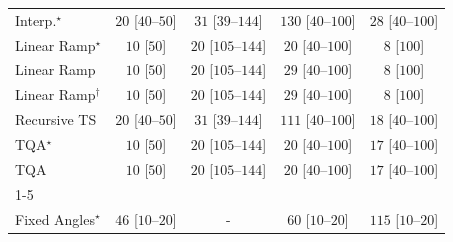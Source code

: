 \begin{tabular}{l|cccc|}
Interp.$^\star$ & {\cellcolor[HTML]{F4FBF2}} \color[HTML]{000000} $20$ [$40$--$50$] & {\cellcolor[HTML]{F2FAEF}} \color[HTML]{000000} $31$ [$39$--$144$] & {\cellcolor[HTML]{DCF2D7}} \color[HTML]{000000} $130$ [$40$--$100$] & {\cellcolor[HTML]{F2FAF0}} \color[HTML]{000000} $28$ [$40$--$100$] \\
Linear Ramp$^\star$ & {\cellcolor[HTML]{F6FCF4}} \color[HTML]{000000} $10$ [$50$] & {\cellcolor[HTML]{F4FBF2}} \color[HTML]{000000} $20$ [$105$--$144$] & {\cellcolor[HTML]{F4FBF2}} \color[HTML]{000000} $20$ [$40$--$100$] & {\cellcolor[HTML]{F6FCF4}} \color[HTML]{000000} $8$ [$100$] \\
Linear Ramp & {\cellcolor[HTML]{F6FCF4}} \color[HTML]{000000} $10$ [$50$] & {\cellcolor[HTML]{F4FBF2}} \color[HTML]{000000} $20$ [$105$--$144$] & {\cellcolor[HTML]{F2FAF0}} \color[HTML]{000000} $29$ [$40$--$100$] & {\cellcolor[HTML]{F6FCF4}} \color[HTML]{000000} $8$ [$100$] \\
Linear Ramp$^\dagger$ & {\cellcolor[HTML]{F6FCF4}} \color[HTML]{000000} $10$ [$50$] & {\cellcolor[HTML]{F4FBF2}} \color[HTML]{000000} $20$ [$105$--$144$] & {\cellcolor[HTML]{F2FAF0}} \color[HTML]{000000} $29$ [$40$--$100$] & {\cellcolor[HTML]{F6FCF4}} \color[HTML]{000000} $8$ [$100$] \\
Recursive TS & {\cellcolor[HTML]{F4FBF2}} \color[HTML]{000000} $20$ [$40$--$50$] & {\cellcolor[HTML]{F2FAEF}} \color[HTML]{000000} $31$ [$39$--$144$] & {\cellcolor[HTML]{E2F4DD}} \color[HTML]{000000} $111$ [$40$--$100$] & {\cellcolor[HTML]{F4FBF2}} \color[HTML]{000000} $18$ [$40$--$100$] \\
TQA$^\star$ & {\cellcolor[HTML]{F6FCF4}} \color[HTML]{000000} $10$ [$50$] & {\cellcolor[HTML]{F4FBF2}} \color[HTML]{000000} $20$ [$105$--$144$] & {\cellcolor[HTML]{F4FBF2}} \color[HTML]{000000} $20$ [$40$--$100$] & {\cellcolor[HTML]{F5FBF2}} \color[HTML]{000000} $17$ [$40$--$100$] \\
TQA & {\cellcolor[HTML]{F6FCF4}} \color[HTML]{000000} $10$ [$50$] & {\cellcolor[HTML]{F4FBF2}} \color[HTML]{000000} $20$ [$105$--$144$] & {\cellcolor[HTML]{F4FBF2}} \color[HTML]{000000} $20$ [$40$--$100$] & {\cellcolor[HTML]{F5FBF2}} \color[HTML]{000000} $17$ [$40$--$100$] \\
\cline{1-5}
\multicolumn{5}{c}{\rule{0pt}{8pt}SV} \\
\midrule
Fixed Angles$^\star$ & {\cellcolor[HTML]{EFF9EC}} \color[HTML]{000000} $46$ [$10$--$20$] & {\cellcolor[HTML]{000000}} \color[HTML]{F1F1F1} {\cellcolor{white}} \color{black} - & {\cellcolor[HTML]{EDF8E9}} \color[HTML]{000000} $60$ [$10$--$20$] & {\cellcolor[HTML]{E1F3DC}} \color[HTML]{000000} $115$ [$10$--$20$] \\

\end{tabular}
